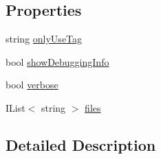 \subsection*{Properties}
\begin{DoxyCompactItemize}
\item 
string \hyperlink{a00083_a8b30c1b7fb1b74eae455a568c1024b3d}{only\-Use\-Tag}
\item 
bool \hyperlink{a00020_a89964ea17bd19caf00cb5bff563ed01c}{show\-Debugging\-Info}
\item 
bool \hyperlink{a00020_ada4d83d1756918f362d55f6649b82b17}{verbose}
\item 
I\-List$<$ string $>$ \hyperlink{a00020_aa93cbb1bc1d5328e0a417012621e92d2}{files}
\end{DoxyCompactItemize}


\subsection{Detailed Description}


